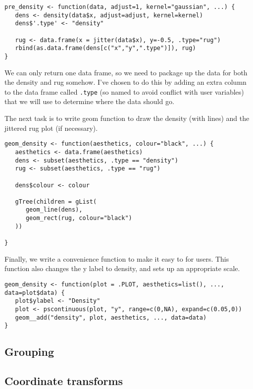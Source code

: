 \begin{verbatim}
pre_density <- function(data, adjust=1, kernel="gaussian", ...) {
   dens <- density(data$x, adjust=adjust, kernel=kernel)
   dens$'.type' <- "density"

   rug <- data.frame(x = jitter(data$x), y=-0.5, .type="rug")
   rbind(as.data.frame(dens[c("x","y",".type")]), rug)
}
\end{verbatim}

We can only return one data frame, so we need to package up the data for both the density and rug somehow.  I've chosen to do this by adding an extra column to the data frame called {\tt .type} (so named to avoid conflict with user variables) that we will use to determine where the data should go.

The next task is to write geom function to draw the density (with lines) and the jittered rug plot (if necessary).

\begin{verbatim}
geom_density <- function(aesthetics, colour="black", ...) {
   aesthetics <- data.frame(aesthetics)
   dens <- subset(aesthetics, .type == "density")
   rug <- subset(aesthetics, .type == "rug")

   dens$colour <- colour

   gTree(children = gList(
      geom_line(dens),
      geom_rect(rug, colour="black")
   ))

}
\end{verbatim}

Finally, we write a convenience function to make it easy to for users.  This function also changes the y label to density, and sets up an appropriate scale.

\begin{verbatim}
geom_density <- function(plot = .PLOT, aesthetics=list(), ..., data=plot$data) {
   plot$ylabel <- "Density"
   plot <- pscontinuous(plot, "y", range=c(0,NA), expand=c(0.05,0))
   geom__add("density", plot, aesthetics, ..., data=data)
}  
\end{verbatim}

\subsection{Grouping}
\label{sub:grouping}

\subsection{Coordinate transforms}
\label{sub:coordinate_transforms}

